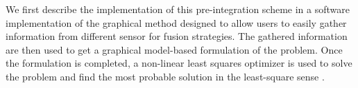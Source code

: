 We first describe the implementation of this pre-integration scheme in a software implementation of the graphical method designed to
allow users to easily gather information from different sensor for fusion strategies.
The gathered information are then used to get a graphical model-based formulation of the problem. 
Once the formulation is completed, a non-linear least squares optimizer is used to solve the problem and find the most probable solution in the least-square sense \cite{ceres-solver}.





